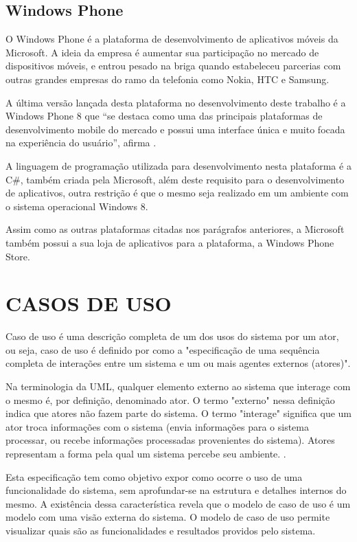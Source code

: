 \documentclass[
	12pt,				%
	openright,			%
	oneside,			%
	a4paper,			%
	chapter=TITLE,		%
	section=TITLE,		%
	english,			%
	french,				%
	spanish,			%
	brazil				%
	]{abntex2}
\begin{document}
\subsection{Windows Phone}
O Windows Phone é a plataforma de desenvolvimento de aplicativos móveis da Microsoft. A ideia da empresa é aumentar sua participação no mercado de dispositivos móveis, e entrou pesado na briga quando estabeleceu parcerias com outras grandes empresas do ramo da telefonia como Nokia, HTC e Samsung. 

A última versão lançada desta plataforma no desenvolvimento deste trabalho é a Windows Phone 8 que “se destaca como uma das principais plataformas de desenvolvimento mobile do mercado e possui uma interface única e muito focada na experiência do usuário”, afirma . 

A linguagem de programação utilizada para desenvolvimento nesta plataforma é a C\#, também criada pela Microsoft, além deste requisito para o desenvolvimento de aplicativos, outra restrição é que o mesmo seja realizado em um ambiente com o sistema operacional Windows 8. 

Assim como as outras plataformas citadas nos parágrafos anteriores, a Microsoft também possui a sua loja de aplicativos para a plataforma, a Windows Phone Store.


\section{CASOS DE USO}
Caso de uso é uma descrição completa de um dos usos do sistema por um ator, ou seja, caso de uso é definido por  como a "especificação de uma sequência completa de interações entre um sistema e um ou mais agentes externos (atores)".

\begin{citacao}
Na terminologia da UML, qualquer elemento externo ao sistema que interage com o mesmo é, por definição, denominado ator. O termo "externo" nessa definição indica que atores não fazem parte do sistema. O termo "interage" significa que um ator troca informações com o sistema (envia informações para o sistema processar, ou recebe informações processadas provenientes do sistema). Atores representam a forma pela qual um sistema percebe seu ambiente. \cite[p. 60]{bezerraUML}.
\end{citacao}

Esta especificação tem como objetivo expor como ocorre o uso de uma funcionalidade do sistema, sem aprofundar-se na estrutura e detalhes internos do mesmo. A existência dessa característica revela que o modelo de caso de uso é um modelo com uma visão externa do sistema. O modelo de caso de uso permite visualizar quais são as funcionalidades e resultados providos pelo sistema.
\end{document}
